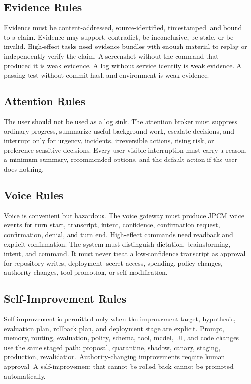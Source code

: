 \documentclass[10pt,journal,onecolumn]{IEEEtran}
\begin{document}
\subsection{Evidence Rules}
Evidence must be content-addressed, source-identified, timestamped, and bound to a claim. Evidence may support, contradict, be inconclusive, be stale, or be invalid. High-effect tasks need evidence bundles with enough material to replay or independently verify the claim. A screenshot without the command that produced it is weak evidence. A log without service identity is weak evidence. A passing test without commit hash and environment is weak evidence.

\subsection{Attention Rules}
The user should not be used as a log sink. The attention broker must suppress ordinary progress, summarize useful background work, escalate decisions, and interrupt only for urgency, incidents, irreversible actions, rising risk, or preference-sensitive decisions. Every user-visible interruption must carry a reason, a minimum summary, recommended options, and the default action if the user does nothing.

\subsection{Voice Rules}
Voice is convenient but hazardous. The voice gateway must produce JPCM voice events for turn start, transcript, intent, confidence, confirmation request, confirmation, denial, and turn end. High-effect commands need readback and explicit confirmation. The system must distinguish dictation, brainstorming, intent, and command. It must never treat a low-confidence transcript as approval for repository writes, deployment, secret access, spending, policy changes, authority changes, tool promotion, or self-modification.

\subsection{Self-Improvement Rules}
Self-improvement is permitted only when the improvement target, hypothesis, evaluation plan, rollback plan, and deployment stage are explicit. Prompt, memory, routing, evaluation, policy, schema, tool, model, UI, and code changes use the same staged path: proposal, quarantine, shadow, canary, staging, production, revalidation. Authority-changing improvements require human approval. A self-improvement that cannot be rolled back cannot be promoted automatically.
\end{document}
